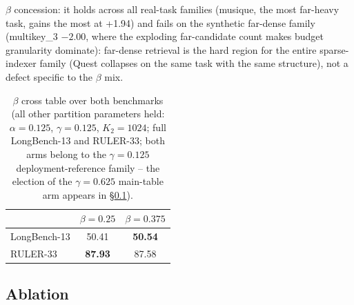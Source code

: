 \documentclass[11pt]{article}
\begin{document}
$\beta$ concession: it holds across all real-task families (musique, the most far-heavy task, gains the most at +1.94) and fails on the synthetic far-dense family (multikey\_3 $-2.00$, where the exploding far-candidate count makes budget granularity dominate): far-dense retrieval is the hard region for the entire sparse-indexer family (Quest collapses on the same task with the same structure), not a defect specific to the $\beta$ mix.

\begin{table}[h]\centering
\caption{$\beta$ cross table over both benchmarks (all other partition parameters held: $\alpha{=}0.125$, $\gamma{=}0.125$, $K_2{=}1024$; full LongBench-13 and RULER-33; both arms belong to the $\gamma{=}0.125$ deployment-reference family -- the election of the $\gamma{=}0.625$ main-table arm appears in \S\ref{sec:abl}).}
\label{tab:betacross}
\begin{tabular}{lcc}
\toprule
 & $\beta{=}0.25$ & $\beta{=}0.375$ \\
\midrule
LongBench-13 & 50.41 & \textbf{50.54} \\
RULER-33 & \textbf{87.93} & 87.58 \\
\bottomrule
\end{tabular}
\end{table}

\subsection{Ablation}\label{sec:abl}
\end{document}
